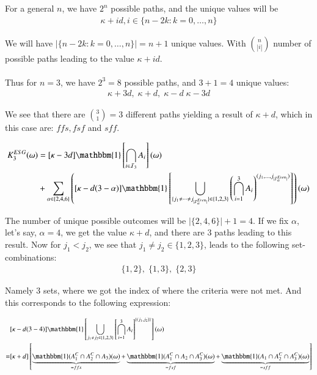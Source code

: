 For a general $n$, we have $2^{n}$ possible paths, and the unique values will be
\begin{align*}
\kappa + id, i\in \{n-2k: k=0, \dots, n\}    
\end{align*}

We will have $|\{n-2k: k=0, \dots, n\}| = n + 1$ unique values. With ${n \choose |i|}$ number of possible paths leading to the value $\kappa + id$. 
\\~\\
Thus for $n = 3$, we have $2^{3} = 8$ possible paths, and $3+1 =4$ unique values: 
\begin{align*}
\kappa +3d, \; \kappa +d,\; \kappa -d\; \kappa - 3d    
\end{align*} 

We see that there are ${3 \choose 1} = 3$ different paths yielding a result of $\kappa +d$, which in this case are: $ffs, fsf$ and $sff$. 

\newpage 

\begin{align*}
K_{3}^{ESG}(\omega) &= 
[\kappa -3d]\mathbbm{1}\left[
\bigcap_{i\in \mathcal{I}_{3}}A_{i}
\right](\omega) \\ 
&+ 
\sum_{\alpha \in \{2,4,6\}}
\left(
[\kappa -d(3-\alpha)]\mathbbm{1}\left[
\bigcup_{\{
j_{1}\neq \dots \neq j_{|\mathcal{I}_{\alpha}^{Even}|}
\}
\in \{1,2,3\}
}\left(
\bigcap_{i =1}^{3}A_{i}
\right)^{
(j_{1}, \dots , j_{|\mathcal{I}_{\alpha}^{Even}|})
}
\right]
\right)(\omega) 
\end{align*}

The number of unique possible outcomes will be $|\{2,4,6\}| + 1 = 4$. If we fix $\alpha$, let's say, $\alpha = 4$, we get the value $\kappa +d$, and there are $3$ paths leading to this result. Now for $j_{1} < j_{2}$, we see that $j_{1} \neq j_{2} \in \{1,2,3\}$, leads to the following set-combinations: 
\begin{align*}
\{1,2\}, \; \{1,3\},\; \{2,3\}    
\end{align*}

Namely $3$ sets, where we got the index of where the criteria were not met. And this corresponds to the following expression: 

\begin{align*}
 &[\kappa - d(3-4)]\mathbbm{1}\left[
\bigcup_{j_{1}\neq j_{2}\in \{1,2,3\}}
\left[\bigcap_{i=1}^{3}A_{i}\right]^{\{(j_{1}, j_{2})\}}
\right](\omega) \\
= &[\kappa + d]\left[
\underbrace{
\mathbbm{1}(A_{1}^{C}\cap A_{2}^{C}\cap A_{3})(\omega)
}_{=ffs}
+ 
\underbrace{
\mathbbm{1}(A_{1}^{C}\cap A_{2}\cap A_{3}^{C})(\omega)
}_{=fsf} + 
\underbrace{
\mathbbm{1}(A_{1}\cap A_{2}^{C}\cap A_{3}^{C})(\omega)
}_{= sff}
\right]   
\end{align*}


